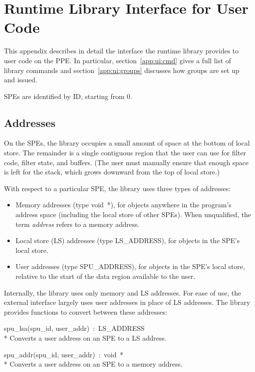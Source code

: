 \chapter{Runtime Library Interface for User Code}\label{app:ui}

This appendix describes in detail the interface the runtime library provides to user code on the PPE. In particular, section~\ref{app:ui:cmd} gives a full list of library commands and section~\ref{app:ui:groups} discusses how groups are set up and issued.

SPEs are identified by ID, starting from 0.

\section{Addresses}

On the SPEs, the library occupies a small amount of space at the bottom of local store. The remainder is a single contiguous region that the user can use for filter code, filter state, and buffers. (The user must manually ensure that enough space is left for the stack, which grows downward from the top of local store.)

With respect to a particular SPE, the library uses three types of addresses:
\begin{itemize}
\item Memory addresses (type \textsf{void~*}), for objects anywhere in the program's address space (including the local store of other SPEs). When unqualified, the term \emph{address} refers to a memory address.
\item Local store (LS) addresses (type \textsf{LS\_ADDRESS}), for objects in the SPE's local store.
\item User addresses (type \textsf{SPU\_ADDRESS}), for objects in the SPE's local store, relative to the start of the data region available to the user.
\end{itemize}

Internally, the library uses only memory and LS addresses. For ease of use, the external interface largely uses user addresses in place of LS addresses. The library provides functions to convert between these addresses:
\begin{description}
\item \textsf{spu\_lsa(spu\_id, user\_addr)~:~LS\_ADDRESS} \\*
Converts a user address on an SPE to a LS address.

\item \textsf{spu\_addr(spu\_id, user\_addr)~:~void~*} \\*
Converts a user address on an SPE to a memory address.
\end{description}

